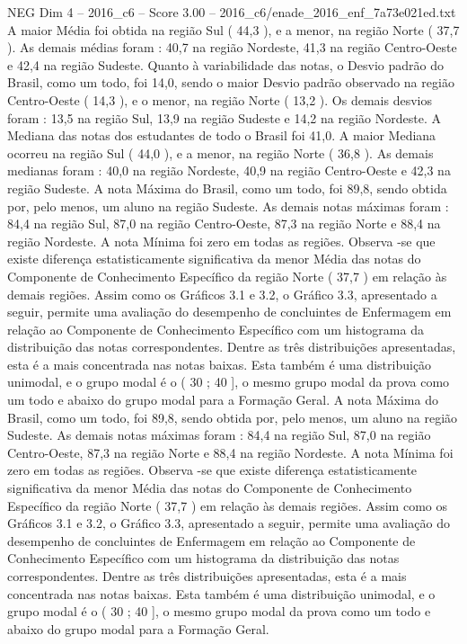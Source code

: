 \begin{textsample}{NEG Dim 4 – 2016\_c6 – Score 3.00 – 2016\_c6/enade\_2016\_enf\_7a73e021ed.txt}
A maior Média foi obtida na região Sul ( 44,3 ), e a menor, na região Norte ( 37,7 ).
As demais médias foram : 40,7 na região Nordeste, 41,3 na região Centro-Oeste e 42,4 na região Sudeste.
Quanto à variabilidade das notas, o Desvio padrão do Brasil, como um todo, foi 14,0, sendo o maior Desvio padrão observado na região Centro-Oeste ( 14,3 ), e o menor, na região Norte ( 13,2 ).
Os demais desvios foram : 13,5 na região Sul, 13,9 na região Sudeste e 14,2 na região Nordeste.
A Mediana das notas dos estudantes de todo o Brasil foi 41,0.
A maior Mediana ocorreu na região Sul ( 44,0 ), e a menor, na região Norte ( 36,8 ).
As demais medianas foram : 40,0 na região Nordeste, 40,9 na região Centro-Oeste e 42,3 na região Sudeste.
A nota Máxima do Brasil, como um todo, foi 89,8, sendo obtida por, pelo menos, um aluno na região Sudeste.
As demais notas máximas foram : 84,4 na região Sul, 87,0 na região Centro-Oeste, 87,3 na região Norte e 88,4 na região Nordeste.
A nota Mínima foi zero em todas as regiões.
Observa -se que existe diferença estatisticamente significativa da menor Média das notas do Componente de Conhecimento Específico da região Norte ( 37,7 ) em relação às demais regiões.
Assim como os Gráficos 3.1 e 3.2, o Gráfico 3.3, apresentado a seguir, permite uma avaliação do desempenho de concluintes de Enfermagem em relação ao Componente de Conhecimento Específico com um histograma da distribuição das notas correspondentes.
Dentre as três distribuições apresentadas, esta é a mais concentrada nas notas baixas.
Esta também é uma distribuição unimodal, e o grupo modal é o ( 30 ; 40 ], o mesmo grupo modal da prova como um todo e abaixo do grupo modal para a Formação Geral.
A nota Máxima do Brasil, como um todo, foi 89,8, sendo obtida por, pelo menos, um aluno na região Sudeste.
As demais notas máximas foram : 84,4 na região Sul, 87,0 na região Centro-Oeste, 87,3 na região Norte e 88,4 na região Nordeste.
A nota Mínima foi zero em todas as regiões.
Observa -se que existe diferença estatisticamente significativa da menor Média das notas do Componente de Conhecimento Específico da região Norte ( 37,7 ) em relação às demais regiões.
Assim como os Gráficos 3.1 e 3.2, o Gráfico 3.3, apresentado a seguir, permite uma avaliação do desempenho de concluintes de Enfermagem em relação ao Componente de Conhecimento Específico com um histograma da distribuição das notas correspondentes.
Dentre as três distribuições apresentadas, esta é a mais concentrada nas notas baixas.
Esta também é uma distribuição unimodal, e o grupo modal é o ( 30 ; 40 ], o mesmo grupo modal da prova como um todo e abaixo do grupo modal para a Formação Geral.

\end{textsample}

